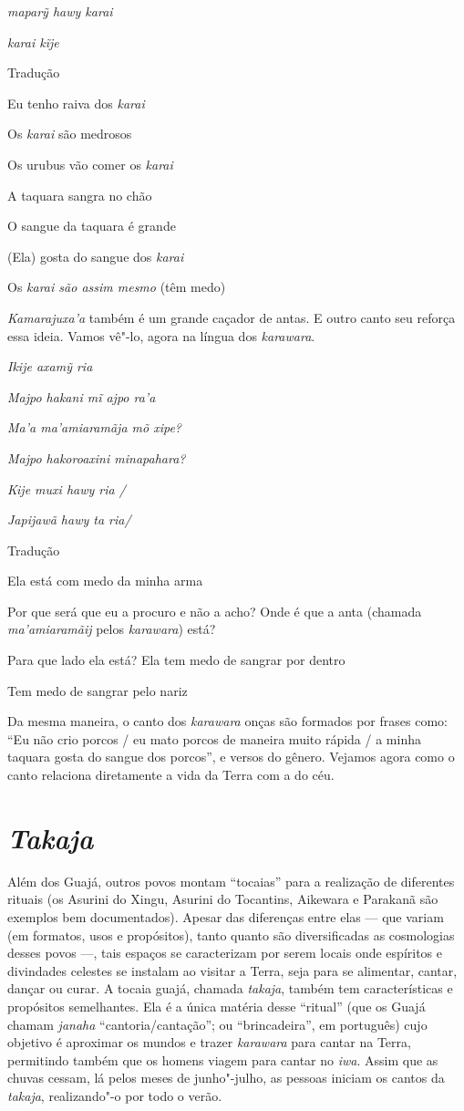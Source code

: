 \emph{maparỹ hawy karai}

\emph{karai kĩje}

Tradução

Eu tenho raiva dos \emph{karai}

Os \emph{karai} são medrosos

Os urubus vão comer os \emph{karai}

A taquara sangra no chão

O sangue da taquara é grande

(Ela) gosta do sangue dos \emph{karai}

Os \emph{karai são assim mesmo} (têm medo)

\emph{Kamarajuxa'a} também é um grande caçador de antas. E outro canto
seu reforça essa ideia. Vamos vê"-lo, agora na língua dos
\emph{karawara}.

\emph{Ikije axamỹ ria }

\emph{Majpo hakani mĩ ajpo ra'a }

\emph{Ma'a ma'amiaramãja mõ xipe? }

\emph{Majpo hakoroaxini minapahara? }

\emph{Kije muxi hawy ria /}

\emph{Japijawã hawy ta ria/ }

Tradução

Ela está com medo da minha arma

Por que será que eu a procuro e não a acho? Onde é que a anta (chamada
\emph{ma'amiaramãij} pelos \emph{karawara}) está?

Para que lado ela está? Ela tem medo de sangrar por dentro

Tem medo de sangrar pelo nariz

Da mesma maneira, o canto dos \emph{karawara} onças são formados por
frases como: ``Eu não crio porcos / eu mato porcos de maneira muito
rápida / a minha taquara gosta do sangue dos porcos'', e versos do
gênero. Vejamos agora como o canto relaciona diretamente a vida da Terra
com a do céu.

\section{\emph{Takaja}}\label{takaja}

Além dos Guajá, outros povos montam ``tocaias'' para a realização de
diferentes rituais (os Asurini do Xingu, Asurini do Tocantins, Aikewara
e Parakanã são exemplos bem documentados). Apesar das diferenças entre
elas --- que variam (em formatos, usos e propósitos), tanto quanto são
diversificadas as cosmologias desses povos ---, tais espaços se
caracterizam por serem locais onde espíritos e divindades celestes se
instalam ao visitar a Terra, seja para se alimentar, cantar, dançar ou
curar. A tocaia guajá, chamada \emph{takaja}, também tem características
e propósitos semelhantes. Ela é a única matéria desse ``ritual'' (que os
Guajá chamam \emph{janaha} ``cantoria/cantação''; ou ``brincadeira'', em
português) cujo objetivo é aproximar os mundos e trazer \emph{karawara}
para cantar na Terra, permitindo também que os homens viagem para cantar
no \emph{iwa}. Assim que as chuvas cessam, lá pelos meses de
junho"-julho, as pessoas iniciam os cantos da \emph{takaja}, realizando"-o
por todo o verão.


